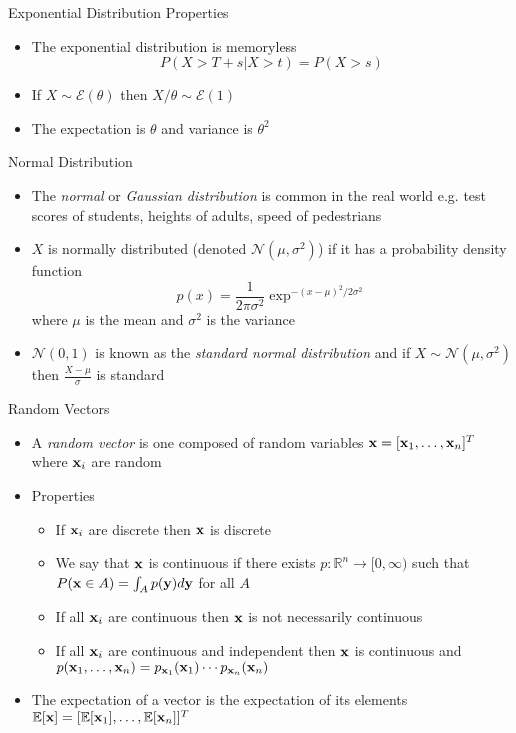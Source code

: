 \documentclass{beamer}
\begin{document}
\begin{frame}{Exponential Distribution Properties}
\begin{itemize} 
 \item The exponential distribution is memoryless 
 \begin{displaymath}
  P(X > T + s | X > t) = P(X > s)
 \end{displaymath}
\item If $X \sim \mathcal{E}(\theta)$ then $X/\theta \sim \mathcal{E}(1)$
\item The expectation is $\theta$ and variance is $\theta^2$ 
\end{itemize}
\end{frame}

\begin{frame}{Normal Distribution}  
\begin{itemize} 
 \item The \emph{normal} or \emph{Gaussian distribution} is common in the real world e.g. test scores of students, heights of adults, speed of pedestrians 
\item $X$ is normally distributed (denoted $\mathcal{N}(\mu, \sigma^2)$) if it has a probability density function 
\begin{displaymath} 
 p(x) = \frac{1}{2\pi\sigma^2}\exp^{-(x-\mu)^2/2\sigma^2} 
\end{displaymath}
where $\mu$ is the mean and $\sigma^2$ is the variance
\item $\mathcal{N}(0, 1)$ is known as the \emph{standard normal distribution} and if $X \sim \mathcal{N}(\mu, \sigma^2)$ then $\frac{X-\mu}{\sigma}$ is standard 
\end{itemize}
\end{frame}

\begin{frame}{Random Vectors}
\begin{itemize} 
 \item A \emph{random vector} is one composed of random variables $\textbf{x} = [\textbf{x}_1, \ldots, \textbf{x}_n]^T$ where $\textbf{x}_i$ are random 
 \item Properties 
 \begin{itemize}
 \item If $\textbf{x}_i$ are discrete then $\textbf{x}$ is discrete 
 \item We say that $\textbf{x}$ is continuous if there exists $p: \mathbb{R}^n \rightarrow [0, \infty)$ such that $P(\textbf{x} \in A) = \int_A p(\textbf{y}) d \textbf{y} $ for all $A$
 \item If all $\textbf{x}_i$ are continuous then $\textbf{x}$ is not necessarily continuous
 \item If all $\textbf{x}_i$ are continuous and independent then $\textbf{x}$ is continuous and $p(\textbf{x}_1, \ldots, \textbf{x}_n) = p_{\textbf{x}_1}(\textbf{x}_1) \cdots p_{\textbf{x}_n}(\textbf{x}_n)$ 
 \end{itemize} 
 \item The expectation of a vector is the expectation of its elements  $\mathbb{E}[\textbf{x}] = [\mathbb{E}[\textbf{x}_1], \ldots, \mathbb{E}[\textbf{x}_n]]^T$ 
\end{itemize} 
\end{frame}
\end{document}
